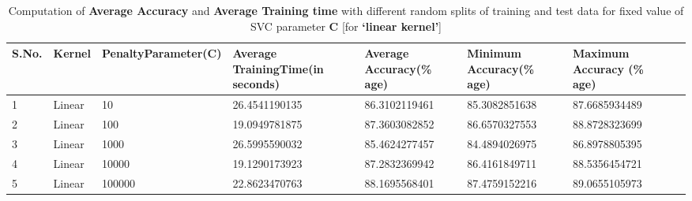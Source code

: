 \documentclass{report}
\begin{document}
\begin{table}[!h]
\centering
\begin{tabular}{|p{0.7cm}|p{1.5cm}|p{2.3cm}|p{2.3cm}|p{2.3cm}|p{2.3cm}|p{2.3cm}|p{2.3cm}|}
\hline
\textbf{S.No.} & \textbf{Kernel} & \textbf{Penalty\linebreak Parameter\linebreak (C)} & \textbf{Average Training\linebreak Time\linebreak(in seconds)} & \textbf{Average Accuracy\linebreak (\% age)} & \textbf{Minimum Accuracy\linebreak (\% age)} & \textbf{Maximum Accuracy \linebreak (\% age)} \\ \hline
1              & Linear          & 10                              & 26.4541190135                               & 86.3102119461                      & 85.3082851638                     & 87.6685934489                     \\ \hline
2              & Linear          & 100                             & 19.0949781875                               & 87.3603082852                      & 86.6570327553                     & 88.8728323699                     \\ \hline
3              & Linear          & 1000                            & 26.5995590032                               & 85.4624277457                      & 84.4894026975                     & 86.8978805395                     \\ \hline
4              & Linear          & 10000                           & 19.1290173923                               & 87.2832369942                      & 86.4161849711                     & 88.5356454721                     \\ \hline
5              & Linear          & 100000                          & 22.8623470763                               & 88.1695568401                      & 87.4759152216                     & 89.0655105973                     \\ \hline
\end{tabular}
\caption{Computation of \textbf{Average Accuracy} and \textbf{Average Training time} with different random splits of training and test data for fixed value of SVC parameter \textbf{C} [for \textbf{‘linear kernel'}]}
\label{my-table}
\end{table}
\pagebreak
\end{document}
